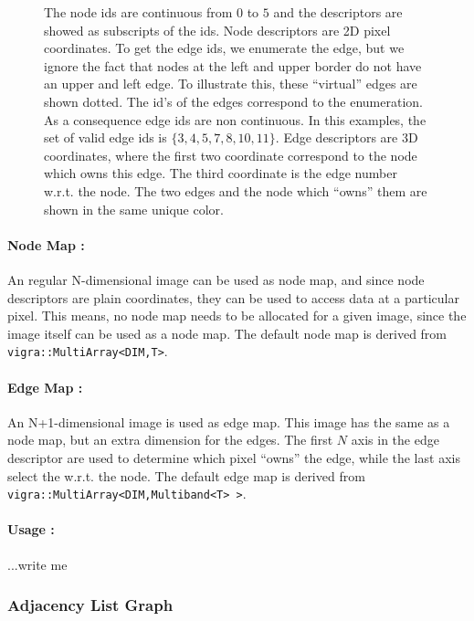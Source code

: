 \begin{figure}[H]
{    The node ids are continuous from $0$ to $5$ and the descriptors
    are showed as subscripts of the ids.
    Node descriptors are 2D pixel coordinates.
    To get the edge ids, we enumerate the edge, but we ignore the fact that nodes at the
    left and upper border do
    not have an upper and left edge.
    To illustrate this, these ``virtual'' edges are shown dotted.
    The id's of the edges correspond to the enumeration.
    As a consequence edge ids are non continuous.    
    In this examples, 
    the set of valid edge ids is $\{ 3,4,5,7,8,10,11 \}$.
    Edge descriptors are 3D coordinates, where the first two
    coordinate correspond to the node which owns this edge.
    The third coordinate is the edge number w.r.t. the node.
    The two edges and the node which ``owns'' them are
    shown in the same unique color.

}
\end{figure}

\paragraph{Node Map :} An regular N-dimensional image can
be used as node map, and since node descriptors are plain
coordinates, they can be used to access data at a
particular pixel.
This means, no node map needs to be allocated for a given
image, since the image itself can be used as a node map.
The default node map is derived from \lstinline{vigra::MultiArray<DIM,T>}.

\paragraph{Edge Map :} An N+1-dimensional image is
used as edge map.
This image has the same as a node map, but an extra
dimension for the edges.
The first $N$ axis in the edge descriptor are 
used to determine which pixel ``owns'' the edge,
while the last axis select the w.r.t. the node.
The default edge map is derived from \lstinline{vigra::MultiArray<DIM,Multiband<T> >}.

\paragraph{Usage :}
    ...write me
\subsubsection{Adjacency List Graph} \label{sec:graphs_adjacency_list_graph}

